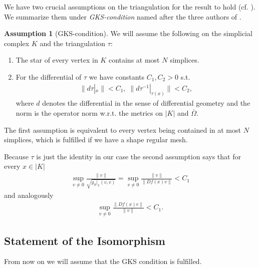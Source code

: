 \documentclass[12pt,a4paper]{article}
\theoremstyle{definition}
\newtheorem{assumption}{Assumption}
\newcommand{\omegabar}{\overline{\Omega}}
\begin{document}
We have two crucial assumptions on the triangulation for the result to hold 
(cf. \cite[p.194]{goldshtein}). We summarize them under 
\textit{GKS-condition} named after the three authors of \cite{goldshtein}.

\begin{assumption}[GKS-condition]
    We will assume the following on the simplicial complex $K$ 
    and the triangulation $\tau$:
    \begin{enumerate}
    \item The star of every vertex in $K$ contains at most $N$ simplices.
    \item For the differential of $\tau$ we have constants 
        $C_1, C_2 > 0$ s.t.
        \begin{align*}
        \lVert d\tau|_x \rVert < C_1, \; 
        \lVert d\tau^{-1}|_{\tau(x)} \rVert < C_2,
        \end{align*}
        where $d$ denotes the differential in the sense of differential 
        geometry and the norm is the operator norm w.r.t. the metrics on $|K|$ 
        and $\omegabar$.
    \end{enumerate}
\end{assumption}
The first assumption is equivalent to every vertex being contained in
at most $N$ simplices, which is fulfilled if we have a shape regular mesh.\par

Because $\tau$ is just the identity in our case 
the second assumption says that for every 
$x \in |K|$
\begin{align*}
\sup\limits_{v \neq 0} \frac{\lVert v \rVert}{\sqrt{g_S|_x(v,v)}} =
\sup\limits_{v \neq 0} \frac{\lVert v \rVert}{\lVert Df(x)v\rVert} < C_1
\end{align*}
and analogously
\begin{align*}
    \sup\limits_{v \neq 0} \frac{\lVert Df(x)v\rVert}{\lVert v \rVert} < C_1.
\end{align*}

\subsection{Statement of the Isomorphism} \label{sec_isomorphism_cohomology}

From now on we will assume that the GKS condition is fulfilled.
\end{document}
